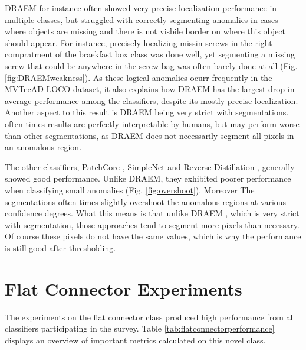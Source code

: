DRAEM \cite{Zavrtanik_2021DRAEM} for instance often showed very precise localization performance in multiple classes, but struggled 
with correctly segmenting anomalies in cases where objects are missing and there is not visbile border on where this object should 
appear. For instance, precisely localizing missin screws in the right compratment of the braekfast box class was done well, yet 
segmenting a missing screw that could be anywhere in the screw bag was often barely done at all (Fig. \ref{fig:DRAEMweakness}). As these logical anomalies ocurr 
frequently in the MVTecAD LOCO \cite{LOCODentsAndScratchesBergmann2022} dataset, it also explains how DRAEM 
has the largest drop in average performance among the classifiers, despite its mostly precise localization. Another aspect to this result is DRAEM being very strict with 
segmentations. often times results are perfectly interpretable by humans, but may perform worse than other segmentations, as DRAEM does not necessarily segment all pixels in 
an anomalous region.



The other classifiers, PatchCore \cite{patchCore2022}, SimpleNet \cite{liu2023simplenet} and Reverse Distillation \cite{revdist2023}, generally showed good performance. Unlike DRAEM, they exhibited 
poorer performance when classifying small anomalies (Fig. \ref{fig:overshoot}). Moreover The segmentations often times slightly overshoot the anomalous regions at various confidence 
degrees. What this means is that unlike DRAEM \cite{Zavrtanik_2021DRAEM}, which is very strict with segmentation, those approaches tend to segment more pixels than necessary. 
Of course these pixels do not have the same values, which is why the performance is still good after thresholding. 





\section{Flat Connector Experiments}
\label{sec:faltconnectorxperiments}

The experiments on the flat connector class produced high performance from all classifiers participating in the survey. Table \ref{tab:flatconnectorperformance} 
displays an overview of important metrics calculated on this novel class.



